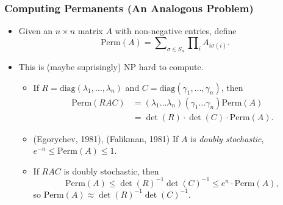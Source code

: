 \documentclass[usenames,dvipsnames,12pt]{beamer}
\begin{document}

\begin{frame}
    \frametitle{Computing Permanents (An Analogous Problem)}

    \begin{itemize}
        \item Given an $n \times n$ matrix $A$ with non-negative entries, define
        \[ \text{Perm}(A) = \sum\nolimits_{\sigma \in S_n} \prod\nolimits_i A_{i \sigma(i)}. \]
        
        \pause
        \item This is (maybe suprisingly) NP hard to compute.

        \begin{itemize}
            \pause
            \item If $R = \text{diag}(\lambda_1, \dots, \lambda_n)$ and $C = \text{diag}(\gamma_1,\dots,\gamma_n)$, then
            \begin{align*}
                \text{Perm}(R A C) &= (\lambda_1 \dots \lambda_n)(\gamma_1 \dots \gamma_n) \text{Perm}(A)\\
                &= \det(R) \cdot \det(C) \cdot \text{Perm}(A).
            \end{align*}

            \pause
            \item (Egorychev, 1981), (Falikman, 1981) If $A$ is \emph{doubly stochastic}, $e^{-n} \leq \text{Perm}(A) \leq 1$.

            \pause
            \item If $RAC$ is doubly stochastic, then
            \[ \text{Perm}(A) \leq \det(R)^{-1} \det(C)^{-1} \leq e^n \cdot \text{Perm}(A), \]
            so $\text{Perm}(A) \approx \det(R)^{-1} \det(C)^{-1}$.
        \end{itemize}
    \end{itemize}
\end{frame}
\end{document}
